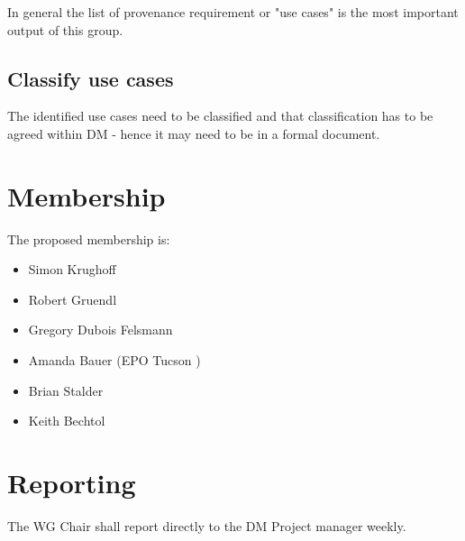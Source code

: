 In general the list of \gls{provenance} requirement or  "use cases"  is the most important output of this group.
\subsection{Classify use cases}
The identified use cases need to be classified and that classification has to be agreed within \gls{DM} - hence it may need to be in a formal document.



\section{Membership}

The proposed membership is:

\begin{itemize}
    \item Simon Krughoff
    \item Robert Gruendl
    \item Gregory Dubois Felsmann
    \item Amanda Bauer (\gls{EPO} Tucson )
    \item Brian Stalder
    \item Keith Bechtol
\end{itemize}


\section{Reporting}

The \gls{WG} Chair shall report directly to the \gls{DM} Project manager weekly.
